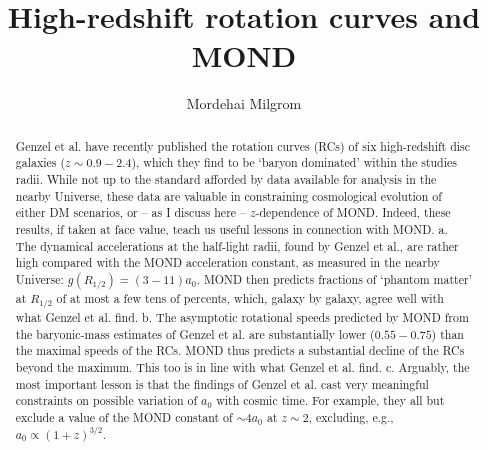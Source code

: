 \documentclass[twocolumn,showpacs,amsmath,amssymb,prd,nofootinbib]
{revtex4}
\def\sss{\scriptscriptstyle}
\def\_#1{_{\sss #1}}
\def\az{a\_{0}}
\def\raf{R\_{1/2}}
\begin{document}
\title{High-redshift rotation curves and MOND}
\author{Mordehai Milgrom} 

\begin{abstract}
Genzel et al. have recently published the rotation curves (RCs) of six high-redshift disc galaxies ($z\sim 0.9-2.4$), which they find to be `baryon  dominated' within the studies radii. While not up to the standard afforded by data available for analysis in the nearby Universe, these data are valuable in constraining cosmological evolution of either DM scenarios, or -- as I discuss here -- $z$-dependence of MOND. Indeed, these results, if taken at face value, teach us useful lessons in connection with MOND.
a. The dynamical accelerations at the half-light radii, found by Genzel et al., are rather high compared with the MOND acceleration constant, as measured in the nearby Universe:
$g(\raf)= (3-11)\az$. MOND then predicts fractions of `phantom matter' at $\raf$ of at most a few tens of percents, which, galaxy by galaxy, agree well with what Genzel et al. find. b. The asymptotic rotational speeds predicted by MOND from the baryonic-mass estimates of Genzel et al. are substantially lower ($0.55-0.75$) than the maximal speeds of the RCs.
MOND thus predicts a substantial decline of the RCs beyond the maximum. This too is in line with what Genzel et al. find. c. Arguably, the most important lesson is that the findings of Genzel et al. cast very meaningful constraints on possible variation of $\az$ with cosmic time. For example, they all but exclude a value of the MOND constant of $\sim 4\az$ at $z\sim 2$, excluding, e.g., $\az\propto (1+z)^{3/2}$.
\end{abstract}
\maketitle
\end{document}
